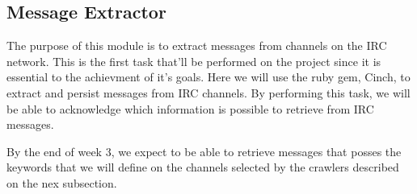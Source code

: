 \documentclass[12pt]{article}
\begin{document}
\begin{center}
    \begin{table}
        \caption{Schedule.}
        \label{table:schedule}
    \end{table}
\end{center}

\subsection{Message Extractor} \label{subsec:extractor}

The purpose of this module is to extract messages from channels on the IRC
network. This is the first task that'll be performed on the project since it
is essential to the achievment of it's goals.
%
Here we will use the ruby gem, Cinch, to extract and persist messages from
IRC channels. By performing this task, we will be able to acknowledge which
information is possible to retrieve from IRC messages.

By the end of week 3, we expect to be able to retrieve messages that posses
the keywords that we will define on the channels selected by the crawlers
described on the nex subsection.
\end{document}
